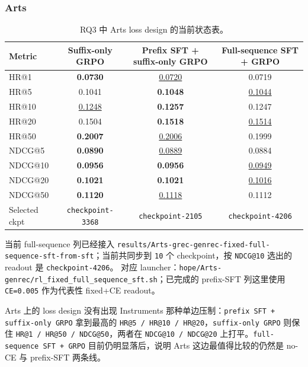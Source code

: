 \documentclass[11pt,a4paper]{ctexart}
\begin{document}
\FloatBarrier

\subsubsection{Arts}

\begin{table}[H]
\centering
\scriptsize
\setlength{\tabcolsep}{4pt}
\renewcommand{\arraystretch}{1.08}
\begin{tabular}{lccc}
\toprule
Metric & Suffix-only GRPO & Prefix SFT + suffix-only GRPO & Full-sequence SFT + GRPO \\
\midrule
HR@1 & \textbf{0.0730} & \underline{0.0720} & 0.0719 \\
HR@5 & 0.1041 & \textbf{0.1048} & \underline{0.1044} \\
HR@10 & \underline{0.1248} & \textbf{0.1257} & 0.1247 \\
HR@20 & 0.1504 & \textbf{0.1518} & \underline{0.1514} \\
HR@50 & \textbf{0.2007} & \underline{0.2006} & 0.1999 \\
NDCG@5 & \textbf{0.0890} & \underline{0.0889} & 0.0884 \\
NDCG@10 & \textbf{0.0956} & \textbf{0.0956} & \underline{0.0949} \\
NDCG@20 & \textbf{0.1021} & \textbf{0.1021} & \underline{0.1016} \\
NDCG@50 & \textbf{0.1120} & \underline{0.1118} & 0.1112 \\
\midrule
Selected ckpt & \texttt{checkpoint-3368} & \texttt{checkpoint-2105} & \texttt{checkpoint-4206} \\
\bottomrule
\end{tabular}
\caption{RQ3 中 Arts loss design 的当前状态表。}
\label{tab:genrec-only-rq3-loss-design-arts}
\end{table}

当前 full-sequence 列已经接入 \texttt{results/Arts-grec-genrec-fixed-full-sequence-sft-from-sft}；当前共同步到 \texttt{10} 个 checkpoint，按 \texttt{NDCG@10} 选出的 readout 是 \texttt{checkpoint-4206}。 对应 launcher：\texttt{hope/Arts-genrec/rl\_fixed\_full\_sequence\_sft.sh}；已完成的 prefix-SFT 列这里使用 \texttt{CE=0.005} 作为代表性 fixed+CE readout。

Arts 上的 loss design 没有出现 Instruments 那种单边压制：\texttt{prefix SFT + suffix-only GRPO} 拿到最高的 \texttt{HR@5 / HR@10 / HR@20}，\texttt{suffix-only GRPO} 则保住 \texttt{HR@1 / HR@50 / NDCG@50}，两者在 \texttt{NDCG@10 / NDCG@20} 上打平。\texttt{full-sequence SFT + GRPO} 目前仍明显落后，说明 Arts 这边最值得比较的仍然是 no-CE 与 prefix-SFT 两条线。
\end{document}
